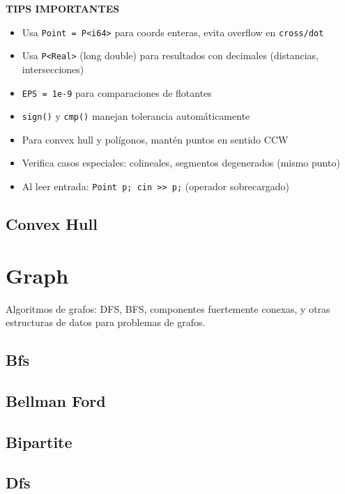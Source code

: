 \vspace{0.3cm}
\textbf{TIPS IMPORTANTES}
\begin{itemize}
    \item Usa \texttt{Point = P<i64>} para coords enteras, evita overflow en \texttt{cross/dot}
    \item Usa \texttt{P<Real>} (long double) para resultados con decimales (distancias, intersecciones)
    \item \texttt{EPS = 1e-9} para comparaciones de flotantes
    \item \texttt{sign()} y \texttt{cmp()} manejan tolerancia automáticamente
    \item Para convex hull y polígonos, mantén puntos en sentido CCW
    \item Verifica casos especiales: colineales, segmentos degenerados (mismo punto)
    \item Al leer entrada: \texttt{Point p; cin >\hspace{0pt}> p;} (operador sobrecargado)
\end{itemize}

\subsection{Convex Hull}

\section{Graph}
Algoritmos de grafos: DFS, BFS, componentes fuertemente conexas, y otras estructuras de datos para problemas de grafos.

\subsection{Bfs}
\subsection{Bellman Ford}
\subsection{Bipartite}
\subsection{Dfs}
